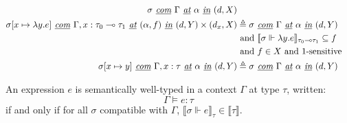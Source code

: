 \begin{definition}
\begin{equation}
\begin{aligned}[c]
      \sigma \textit{ \underline{com} } \Gamma \textit{ \underline{at} } \alpha \textit{ \underline{in} } (d, X)\\
      \sigma[x \mapsto \lambda y . e] \textit{ \underline{com} } \Gamma, x :
      \tau_0 \multimap \tau_1 \textit{ \underline{at} } (\alpha, f) \textit{
        \underline{in} } (d, Y) \times (d_x, X) &\triangleq \sigma \textit{
        \underline{com} } \Gamma \textit{ \underline{at} } \alpha \textit{
        \underline{in} } (d, Y) \\
      & \text{ and } \llbracket \sigma \Vdash \lambda y . e \rrbracket_{\tau_0
      \multimap \tau_1} \subseteq f \\
      & \text{ and } f \in X \text{ and 1-sensitive} \\
      \sigma[x \mapsto y] \textit{ \underline{com} } \Gamma, x :
      \tau \textit{ \underline{at} } \alpha \textit{
        \underline{in} } (d, Y) &\triangleq \sigma \textit{
        \underline{com} } \Gamma \textit{ \underline{at} } \alpha \textit{
        \underline{in} } (d, Y) \\
    \end{aligned}
  \end{equation}
\end{definition}


\begin{definition}
  An expression $e$ is semantically well-typed in a context $\Gamma$ at type
  $\tau$, written:
  $$\Gamma \vDash e : \tau$$
  if and only if for all $\sigma$ compatible with $\Gamma$, $\llbracket \sigma
  \Vdash e \rrbracket_{\tau} \in \llbracket \tau \rrbracket$.
\end{definition}

